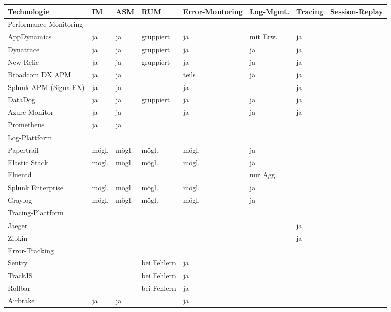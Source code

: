 \begingroup
\centering
\setlength{\LTleft}{-20cm plus -1fill}
\setlength{\LTright}{\LTleft}
\begin{longtable}{|p{4.10cm}|p{0.90cm}|p{0.90cm}|p{1.9cm}|p{1.75cm}|p{1.5cm}|p{1.4cm}|p{1.3cm}|}
\hline
Technologie & IM & ASM & RUM & Error-Montoring & Log-Mgmt. & Tracing & Session-Replay \\
\endhead
\hline
\hline
\multicolumn{8}{|l|}{Performance-Monitoring} \\
\hline
AppDynamics & ja & ja & gruppiert & ja & mit Erw. & ja &  \\
\hline
Dynatrace & ja & ja & gruppiert & ja & ja & ja &  \\
\hline
New Relic & ja & ja & gruppiert & ja & ja & ja &  \\
\hline
Broadcom DX APM & ja & ja &  & teils & ja & ja &  \\
\hline
Splunk APM (SignalFX) & ja & ja &  & ja &  & ja &  \\
\hline
DataDog & ja & ja & gruppiert & ja & ja & ja &  \\
\hline
Azure Monitor & ja & ja &  & ja & ja & ja &  \\
\hline
Prometheus & ja & ja &  &  &  &  &  \\
\hline
\hline
\multicolumn{8}{|l|}{Log-Plattform} \\
\hline
Papertrail & mögl. & mögl. & mögl. & mögl. & ja &  &  \\
\hline
Elastic Stack & mögl. & mögl. & mögl. & mögl. & ja &  &  \\
\hline
Fluentd &  &  &  &  & nur Agg. &  &  \\
\hline
Splunk \mbox{Enterprise} & mögl. & mögl. & mögl. & mögl. & ja &  &  \\
\hline
Graylog & mögl. & mögl. & mögl. & mögl. & ja &  &  \\
\hline
\hline
\multicolumn{8}{|l|}{Tracing-Plattform} \\
\hline
Jaeger &  &  &  &  &  & ja &  \\
\hline
Zipkin &  &  &  &  &  & ja &  \\
\hline
\hline
\multicolumn{8}{|l|}{Error-Tracking} \\
\hline
Sentry &  &  & bei \mbox{Fehlern} & ja &  &  &  \\
\hline
TrackJS &  &  & bei \mbox{Fehlern} & ja &  &  &  \\
\hline
Rollbar &  &  & bei \mbox{Fehlern} & ja &  &  &  \\
\hline
Airbrake & ja & ja &  & ja &  &  &  \\

\end{longtable}
